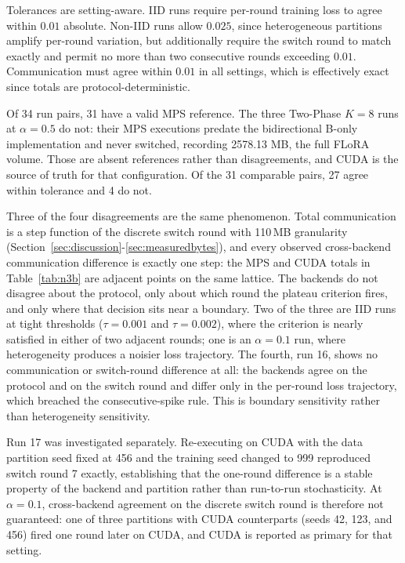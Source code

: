 Tolerances are setting-aware. IID runs require per-round training loss to agree within $0.01$ absolute. Non-IID runs allow $0.025$, since heterogeneous partitions amplify per-round variation, but additionally require the switch round to match exactly and permit no more than two consecutive rounds exceeding $0.01$. Communication must agree within $0.01$ in all settings, which is effectively exact since totals are protocol-deterministic.

Of 34 run pairs, 31 have a valid MPS reference. The three Two-Phase $K{=}8$ runs at $\alpha{=}0.5$ do not: their MPS executions predate the bidirectional B-only implementation and never switched, recording 2578.13 MB, the full FLoRA volume. Those are absent references rather than disagreements, and CUDA is the source of truth for that configuration. Of the 31 comparable pairs, 27 agree within tolerance and 4 do not.

Three of the four disagreements are the same phenomenon. Total communication is a step function of the discrete switch round with 110\,MB granularity (Section~\ref{sec:discussion}-\ref{sec:measuredbytes}), and every observed cross-backend communication difference is exactly one step: the MPS and CUDA totals in Table~\ref{tab:n3b} are adjacent points on the same lattice. The backends do not disagree about the protocol, only about which round the plateau criterion fires, and only where that decision sits near a boundary. Two of the three are IID runs at tight thresholds ($\tau{=}0.001$ and $\tau{=}0.002$), where the criterion is nearly satisfied in either of two adjacent rounds; one is an $\alpha{=}0.1$ run, where heterogeneity produces a noisier loss trajectory. The fourth, run 16, shows no communication or switch-round difference at all: the backends agree on the protocol and on the switch round and differ only in the per-round loss trajectory, which breached the consecutive-spike rule. This is boundary sensitivity rather than heterogeneity sensitivity.

Run 17 was investigated separately. Re-executing on CUDA with the data partition seed fixed at 456 and the training seed changed to 999 reproduced switch round 7 exactly, establishing that the one-round difference is a stable property of the backend and partition rather than run-to-run stochasticity. At $\alpha{=}0.1$, cross-backend agreement on the discrete switch round is therefore not guaranteed: one of three partitions with CUDA counterparts (seeds 42, 123, and 456) fired one round later on CUDA, and CUDA is reported as primary for that setting.

